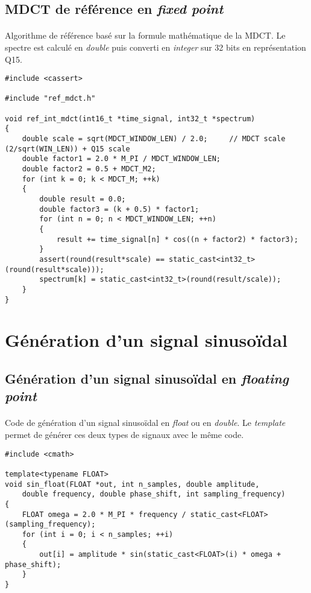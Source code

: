 \documentclass{article}
\begin{document}
\subsection{MDCT de référence en \emph{fixed point}}\label{app:mdct_ref_int}
\paragraph{}
Algorithme de référence basé sur la formule mathématique de la MDCT. Le spectre est calculé en \emph{double} puis converti en \emph{integer} sur 32 bits en représentation Q15.
\lstset{language=C++}
\begin{lstlisting}
#include <cassert>

#include "ref_mdct.h"

void ref_int_mdct(int16_t *time_signal, int32_t *spectrum)
{
    double scale = sqrt(MDCT_WINDOW_LEN) / 2.0;     // MDCT scale (2/sqrt(WIN_LEN)) + Q15 scale
    double factor1 = 2.0 * M_PI / MDCT_WINDOW_LEN;
    double factor2 = 0.5 + MDCT_M2;
    for (int k = 0; k < MDCT_M; ++k)
    {
        double result = 0.0;
        double factor3 = (k + 0.5) * factor1;
        for (int n = 0; n < MDCT_WINDOW_LEN; ++n)
        {
            result += time_signal[n] * cos((n + factor2) * factor3);
        }
        assert(round(result*scale) == static_cast<int32_t>(round(result*scale)));
        spectrum[k] = static_cast<int32_t>(round(result/scale));
    }
}
\end{lstlisting}


\newpage
\section{Génération d'un signal sinusoïdal}\label{app:sin_wave}
\subsection{Génération d'un signal sinusoïdal en \emph{floating point}}\label{app:sin_wave_float}
\paragraph{}
Code de génération d'un signal sinusoïdal en \emph{float} ou en \emph{double}. Le \emph{template} permet de générer ces deux types de signaux avec le même code.
\lstset{language=C++}
\begin{lstlisting}
#include <cmath>

template<typename FLOAT>
void sin_float(FLOAT *out, int n_samples, double amplitude,
    double frequency, double phase_shift, int sampling_frequency)
{
    FLOAT omega = 2.0 * M_PI * frequency / static_cast<FLOAT>(sampling_frequency);
    for (int i = 0; i < n_samples; ++i)
    {
        out[i] = amplitude * sin(static_cast<FLOAT>(i) * omega + phase_shift);
    }
}
\end{lstlisting}
\end{document}

